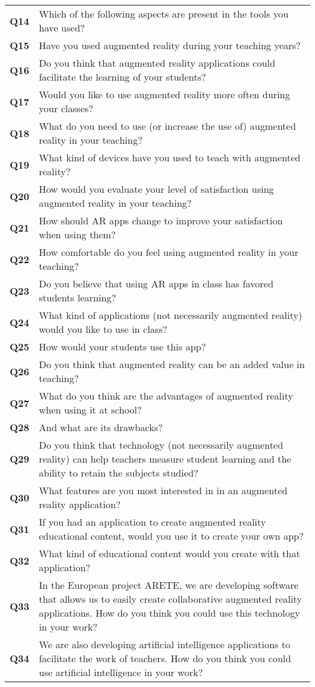\begin{longtable}{p{}>{\arraybackslash}p{}}
    \textbf{Q14} & Which of the following aspects are present in the tools you have used? \\
    \textbf{Q15} & Have you used augmented reality during your teaching years? \\
    \textbf{Q16} & Do you think that augmented reality applications could facilitate the learning of your students? \\
    \textbf{Q17} & Would you like to use augmented reality more often during your classes? \\
    \textbf{Q18} & What do you need to use (or increase the use of) augmented reality in your teaching? \\
    \textbf{Q19} & What kind of devices have you used to teach with augmented reality? \\
    \textbf{Q20} & How would you evaluate your level of satisfaction using augmented reality in your teaching? \\
    \textbf{Q21} & How should AR apps change to improve your satisfaction when using them? \\
    \textbf{Q22} & How comfortable do you feel using augmented reality in your teaching? \\
    \textbf{Q23} & Do you believe that using AR apps in class has favored students learning? \\
    \textbf{Q24} & What kind of applications (not necessarily augmented reality)
would you like to use in class? \\
    \textbf{Q25} & How would your students use this app? \\
    \textbf{Q26} & Do you think that augmented reality can be an added value in teaching? \\
    \textbf{Q27} & What do you think are the advantages of augmented reality when using it at school? \\
    \textbf{Q28} & And what are its drawbacks? \\
    \textbf{Q29} & Do you think that technology (not necessarily augmented reality) can help teachers measure student learning and the ability to retain the subjects studied? \\
    \textbf{Q30} & What features are you most interested in in an augmented reality application? \\
    \textbf{Q31} & If you had an application to create augmented reality educational content, would you use it to create your own app? \\
    \textbf{Q32} & What kind of educational content would you create with that application? \\
    \textbf{Q33} & In the European project ARETE, we are developing software that allows us to easily create collaborative augmented reality applications. How do you think you could use this technology
in your work? \\
    \textbf{Q34} & We are also developing artificial intelligence applications to facilitate
the work of teachers. How do you think you could use artificial intelligence in your work? \\
\bottomrule
\end{longtable}
